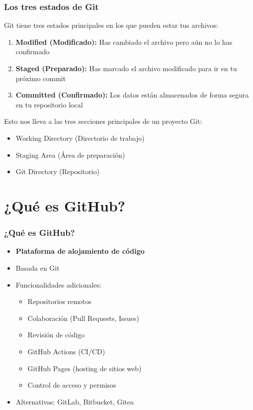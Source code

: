 \documentclass[aspectratio=169]{beamer}
\begin{document}
\begin{frame}
\frametitle{Los tres estados de Git}
Git tiene tres estados principales en los que pueden estar tus archivos:

\begin{enumerate}
    \item \textbf{Modified (Modificado):} Has cambiado el archivo pero aún no lo has confirmado
    \item \textbf{Staged (Preparado):} Has marcado el archivo modificado para ir en tu próximo commit
    \item \textbf{Committed (Confirmado):} Los datos están almacenados de forma segura en tu repositorio local
\end{enumerate}

\vspace{0.5cm}
Esto nos lleva a las tres secciones principales de un proyecto Git:
\begin{itemize}
    \item Working Directory (Directorio de trabajo)
    \item Staging Area (Área de preparación)
    \item Git Directory (Repositorio)
\end{itemize}
\end{frame}

\section{¿Qué es GitHub?}
\begin{frame}
\frametitle{¿Qué es GitHub?}
\begin{itemize}
    \item \textbf{Plataforma de alojamiento de código}
    \item Basada en Git
    \item Funcionalidades adicionales:
    \begin{itemize}
        \item Repositorios remotos
        \item Colaboración (Pull Requests, Issues)
        \item Revisión de código
        \item GitHub Actions (CI/CD)
        \item GitHub Pages (hosting de sitios web)
        \item Control de acceso y permisos
    \end{itemize}
    \item Alternativas: GitLab, Bitbucket, Gitea
\end{itemize}
\end{frame}
\end{document}

